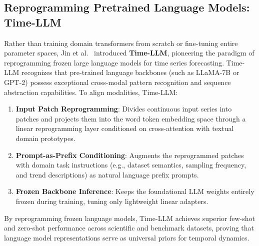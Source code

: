 \subsection{Reprogramming Pretrained Language Models: Time-LLM}
Rather than training domain transformers from scratch or fine-tuning entire parameter spaces, Jin et al.~\cite{jin2024timellm} introduced \textbf{Time-LLM}, pioneering the paradigm of reprogramming frozen large language models for time series forecasting. Time-LLM recognizes that pre-trained language backbones (such as LLaMA-7B or GPT-2) possess exceptional cross-modal pattern recognition and sequence abstraction capabilities. To align modalities, Time-LLM:
\begin{enumerate}
    \item \textbf{Input Patch Reprogramming}: Divides continuous input series into patches and projects them into the word token embedding space through a linear reprogramming layer conditioned on cross-attention with textual domain prototypes.
    \item \textbf{Prompt-as-Prefix Conditioning}: Augments the reprogrammed patches with domain task instructions (e.g., dataset semantics, sampling frequency, and trend descriptions) as natural language prefix prompts.
    \item \textbf{Frozen Backbone Inference}: Keeps the foundational LLM weights entirely frozen during training, tuning only lightweight linear adapters.
\end{enumerate}
By reprogramming frozen language models, Time-LLM achieves superior few-shot and zero-shot performance across scientific and benchmark datasets, proving that language model representations serve as universal priors for temporal dynamics.

